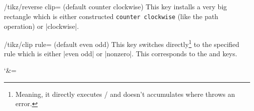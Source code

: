 \pagebreak
\subsection{\tikzname}
\begin{multicols}{2}
\begin{key}{/tikz/reverse clip= (default counter clockwise)}
This key installs a very big rectangle which is either constructed
\texttt{counter clockwise} (like the 
path operation) or |clockwise|.
\end{key}
\begin{key}{/tikz/clip rule= (default even odd)}
This key switches directly\footnote{%
  Meaning, it directly executes
  /%
  and doesn't accumulates where \tikzname\space
  throws an error.}
to the specified rule which is
either |even odd| or |nonzero|.
This corresponds to the  and
 keys.
\end{key}
\end{multicols}
\begingroup\catcode`\&=\active
\begin{codeexample}[preamble=\usetikzlibrary{ext.misc},width=6cm]
\newcommand*\myDiagram[1]{
  \fill[left color=blue, right color=green] (0, 0) rectangle (2, 1);
  \clip (1, .5) #1 [reverse clip];
  \fill[left color=green, right color=blue] (0, 0) rectangle (2, 1);
}
\end{codeexample}
\endgroup
\endinput